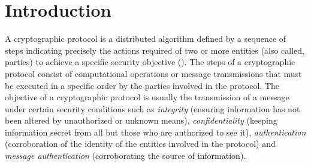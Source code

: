 \documentclass[conference]{IEEEtran}
\def\disgrace{DISCERN}
\begin{document}
\begin{abstract}



\end{abstract}





\section{Introduction}
\label{se:introduction}

A cryptographic protocol is a distributed algorithm defined by a
sequence of steps indicating precisely the actions required of two or
more entities (also called, parties) to achieve a specific security
objective (\cite{handbook}). The steps of a cryptographic protocol
consist of computational operations or message transmissions that must
be executed in a specific order by the parties involved in the
protocol. The objective of a cryptographic protocol is usually the
transmission of a message under certain security conditions such as
{\em integrity} (ensuring information has not been altered by
unauthorized or unknown means), {\em confidentiality} (keeping
information secret from all but those who are authorized to see it),
{\em authentication} (corroboration of the identity of the entities
involved in the protocol) and {\em message authentication}
(corroborating the source of information).
\end{document}
